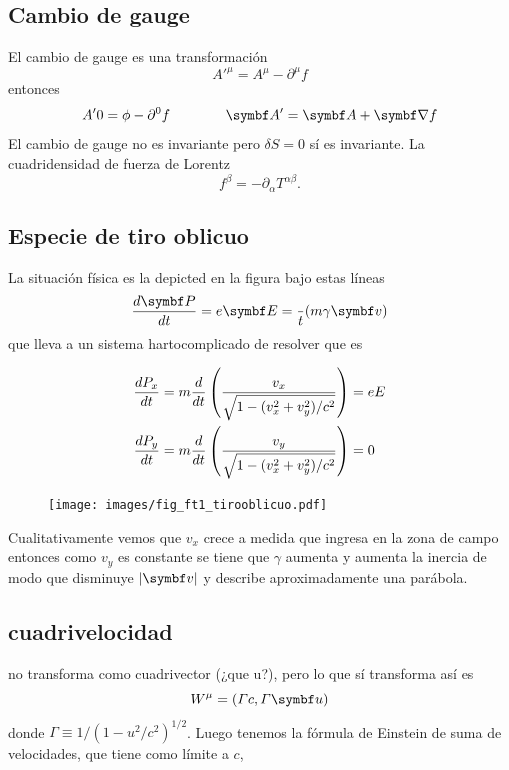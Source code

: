\documentclass[10pt,oneside]{CBFT_book}
\begin{document}
\subsection{Cambio de gauge}

El cambio de gauge es una transformación 
\[
	A'^\mu = A^\mu - \partial^\mu f
\]
entonces 
\[
	A'0 = \phi - \partial^0 f \qquad \qquad \vb{A}' = \vb{A} + \Nabla f
\]
El cambio de gauge no es invariante pero $\delta S = 0$ sí es invariante.
La cuadridensidad de fuerza de Lorentz 
\[
	f^\beta = - \partial_\alpha T^{\alpha\beta}.
\]

\subsection{Especie de tiro oblicuo}

La situación física es la depicted en la figura bajo estas líneas
\[
	\dtot{\vb{P}}{t} = e\vb{E} = \frac{}{t}( m \gamma \vb{v} )
\]
que lleva a un sistema hartocomplicado de resolver que es 

\begin{align*}
 \frac{d^{\hspace{-0.05em}} {P_x}}{d {t}^{\hspace{-0.05em}}} &= m \frac{d^{\hspace{-0.05em}} {}}{d {t}^{\hspace{-0.05em}}}\left( \frac{v_x}{ \sqrt{ 1 - (v_x^2 + v_y^2)/c^2 } }\right) = eE \\
 \frac{d^{\hspace{-0.05em}} {P_y}}{d {t}^{\hspace{-0.05em}}} &= m \frac{d^{\hspace{-0.05em}} {}}{d {t}^{\hspace{-0.05em}}}\left( \frac{v_y}{ \sqrt{ 1 - (v_x^2 + v_y^2)/c^2 } }\right) =0 \\
\end{align*}


\begin{figure}[htb]
	\begin{center}
	\texttt{[image: images/fig\_ft1\_tirooblicuo.pdf]}	 
	\end{center}
	\caption{}
\end{figure} 

Cualitativamente vemos que $v_x$ crece a medida que ingresa en la zona de campo  entonces como $v_y$ es
constante se tiene que $\gamma$ aumenta y aumenta la inercia de modo que disminuye $|\vb{v}|$ y describe
aproximadamente una parábola.

\subsection{cuadrivelocidad}

 no transforma como cuadrivector (¿que u?), pero lo que sí transforma así es
\[
	W^\mu = ( \Gamma c , \Gamma \vb{u} ) 
\]
donde $ \Gamma \equiv 1/( 1 - u^2/c^2)^{1/2}$. Luego tenemos la fórmula de Einstein de suma de velocidades,
que tiene como límite a $c$,
\end{document}
